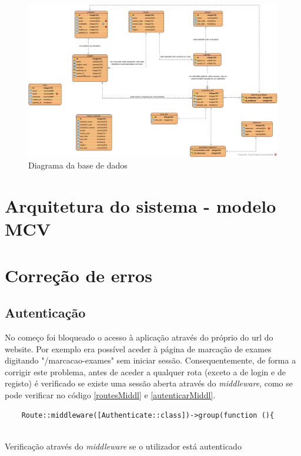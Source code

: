 \documentclass[12pt, twoside]{report}
\begin{document}
	\clearpage
	\begin{landscape}
		\pagestyle{empty}
		
		\begin{figure}[H] 
			\centering 			\includegraphics[width=1.4\textwidth,height=1.4\textheight,keepaspectratio]{image/databaseDiagram}
			\caption{Diagrama da base de dados}
			\label{planeamentoinicial}
			
		\end{figure}
		
		
	\end{landscape}
	
	\section{Arquitetura do sistema - modelo MCV}
	
	
	\section{Correção de erros}

	\subsection{Autenticação}
	No começo foi bloqueado o acesso à aplicação através do próprio do url do website. Por exemplo era possível aceder à página de marcação de exames digitando "/marcacao-exames" sem iniciar sessão. 
	Consequentemente, de forma a corrigir este problema, antes de aceder a qualquer rota (exceto a de login e de registo) é verificado se existe uma sessão aberta através do \textit{middleware}, como se pode verificar no código \ref{routesMiddl} e \ref{autenticarMiddl}.
	
	\begin{listing}[H]
	\begin{verbatim}
	Route::middleware([Authenticate::class])->group(function (){
	
	\end{verbatim}
	\caption{Verificação através do \textit{middleware} se o utilizador está autenticado}
	\label{routesMiddl}
	\end{listing}                                 
		
\end{document}
